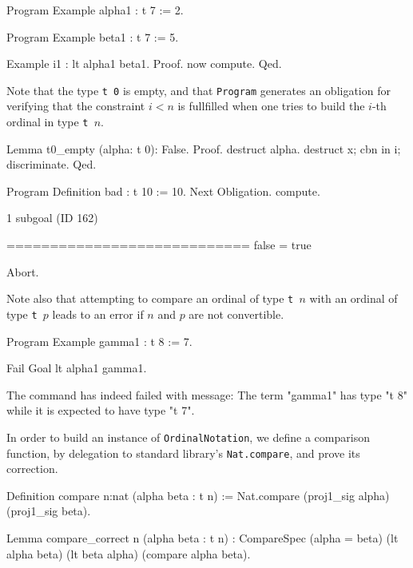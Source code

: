 \begin{Coqsrc}
Program Example alpha1 : t 7 := 2.

Program Example beta1 : t 7 := 5.

Example i1 : lt  alpha1 beta1.
Proof.   now compute. Qed.
\end{Coqsrc}




Note that the type \texttt{t 0} is empty, and that \texttt{Program} generates an obligation
for verifying that the constraint $i<n$ is fullfilled when one tries to build the $i$-th ordinal in type \texttt{t $n$}.

\begin{Coqsrc}
Lemma t0_empty (alpha: t 0): False.
Proof.
  destruct alpha.
  destruct x; cbn in i; discriminate.
Qed.


Program Definition bad : t 10 := 10.
Next Obligation.
  compute.
\end{Coqsrc}

\begin{Coqanswer}
1 subgoal (ID 162)
  
  ============================
  false = true
\end{Coqanswer}

\begin{Coqsrc}
Abort.
\end{Coqsrc}

Note also that attempting to compare an ordinal of type \texttt{t $n$}  with an ordinal of
type \texttt{t $p$}  leads to an error if $n$ and $p$ are not convertible.

\begin{Coqsrc}

Program Example gamma1 : t 8 := 7.

Fail Goal lt alpha1 gamma1.
\end{Coqsrc}

\begin{Coqanswer}
 The command has indeed failed with message:
The term "gamma1" has type "t 8" while it is expected to have type "t 7".
\end{Coqanswer}


In order to build an instance of \texttt{OrdinalNotation}, we define a comparison function, by delegation to standard library's  \texttt{Nat.compare}, and prove its correction.

\begin{Coqsrc}
Definition compare {n:nat} (alpha beta : t n) :=
  Nat.compare (proj1_sig alpha) (proj1_sig beta).

Lemma compare_correct {n} (alpha beta : t n) :
  CompareSpec (alpha = beta) (lt alpha beta) (lt beta alpha)
              (compare alpha beta).
\end{Coqsrc}

